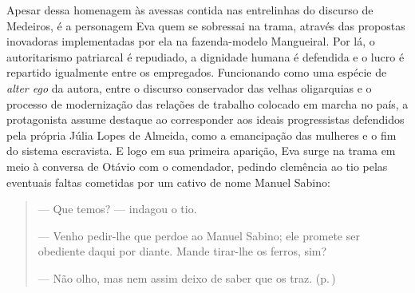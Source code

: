 
Apesar dessa homenagem às avessas contida nas entrelinhas do discurso de
Medeiros, é a personagem Eva quem se sobressai na trama, através das
propostas inovadoras implementadas por ela na fazenda-modelo Mangueiral.
Por lá, o autoritarismo patriarcal é repudiado, a dignidade humana é
defendida e o lucro é repartido igualmente entre os empregados.
Funcionando como uma espécie de \emph{alter ego} da autora, entre o
discurso conservador das velhas oligarquias e o processo de modernização
das relações de trabalho colocado em marcha no país, a protagonista
assume destaque ao corresponder aos ideais progressistas defendidos pela
própria Júlia Lopes de Almeida, como a emancipação das mulheres e o fim
do sistema escravista. E logo em sua primeira aparição, Eva surge na
trama em meio à conversa de Otávio com o comendador, pedindo clemência
ao tio pelas eventuais faltas cometidas por um cativo de nome Manuel
Sabino:

\begin{quote}
\hspace{1.3em}--- Que temos? --- indagou o tio.

--- Venho pedir-lhe que perdoe ao Manuel Sabino; ele promete ser
obediente daqui por diante. Mande tirar-lhe os ferros, sim?


--- Não olho, mas nem assim deixo de saber que os traz. (p.\,\pageref{Ref5})
\end{quote}


